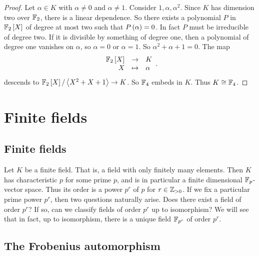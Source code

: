 \begin{proof}
Let $ \alpha \in K $ with $ \alpha \ne 0 $ and $ \alpha \ne 1 $. Consider $ 1, \alpha, \alpha^2 $. Since $ K $ has dimension two over $ \mathbb{F}_2 $, there is a linear dependence. So there exists a polynomial $ P $ in $ \mathbb{F}_2\left[ X \right] $ of degree at most two such that $ P\left( \alpha \right) = 0 $. In fact $ P $ must be irreducible of degree two. If it is divisible by something of degree one, then a polynomial of degree one vanishes on $ \alpha $, so $ \alpha = 0 $ or $ \alpha = 1 $. So $ \alpha^2 + \alpha + 1 = 0 $. The map
$$ \function{\F_2\sb{X}}{K}{X}{\alpha}. $$
descends to $ \mathbb{F}_2\left[ X \right] / \left\langle X^2 + X + 1 \right\rangle \to K $. So $ \mathbb{F}_4 $ embeds in $ K $. Thus $ K \cong \mathbb{F}_4 $.
\end{proof}

\pagebreak

\section{Finite fields}


\subsection{Finite fields}

Let $ K $ be a finite field. That is, a field with only finitely many elements. Then $ K $ has characteristic $ p $ for some prime $ p $, and is in particular a finite dimensional $ \mathbb{F}_p $-vector space. Thus its order is a power $ p^r $ of $ p $ for $ r \in \mathbb{Z}_{> 0} $. If we fix a particular prime power $ p^r $, then two questions naturally arise. Does there exist a field of order $ p^r $? If so, can we classify fields of order $ p^r $ up to isomorphism? We will see that in fact, up to isomorphism, there is a unique field $ \mathbb{F}_{p^r} $ of order $ p^r $.

\subsection{The Frobenius automorphism}

